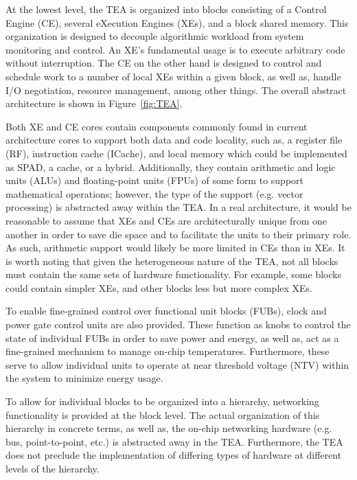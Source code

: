         At the lowest level, the TEA is organized into blocks consisting of a Control Engine (CE), several eXecution Engines (XEs), and a block shared memory. This organization is designed to decouple algorithmic workload from system monitoring and control. An XE's fundamental usage is to execute arbitrary code without interruption. The CE on the other hand is designed to control and schedule work to a number of local XEs within a given block, as well as, handle I/O negotiation, resource management, among other things. The overall abstract architecture is shown in Figure~\ref{fig:TEA}.
        
        Both XE and CE cores contain components commonly found in current architecture cores to support both data and code locality, such as, a register file (RF), instruction cache (ICache), and local memory which could be implemented as SPAD, a cache, or a hybrid. Additionally, they contain arithmetic and logic units (ALUs) and floating-point units (FPUs) of some form to support mathematical operations; however, the type of the support (e.g. vector processing) is abstracted away within the TEA. In a real architecture, it would be reasonable to assume that XEs and CEs are architecturally unique from one another in order to save die space and to facilitate the units to their primary role. As such, arithmetic support would likely be more limited in CEs than in XEs. It is worth noting that given the heterogeneous nature of the TEA, not all blocks must contain the same sets of hardware functionality. For example, some blocks could contain simpler XEs, and other blocks less but more complex XEs. 
        
        To enable fine-grained control over functional unit blocks (FUBs), clock and power gate control units are also provided. These function as knobs to control the state of individual FUBs in order to save power and energy, as well as, act as a fine-grained mechanism to manage on-chip temperatures. Furthermore, these serve to allow individual units to operate at near threshold voltage (NTV) within the system to minimize energy usage.
        
        To allow for individual blocks to be organized into a hierarchy, networking functionality is provided at the block level. The actual organization of this hierarchy in concrete terms, as well as, the on-chip networking hardware (e.g. bus, point-to-point, etc.) is abstracted away in the TEA. Furthermore, the TEA does not preclude the implementation of differing types of hardware at different levels of the hierarchy.

